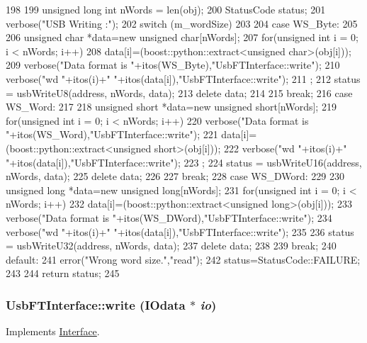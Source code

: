 \begin{DoxyCode}
198 {
199   unsigned long int nWords = len(obj);
200   StatusCode status;
201   verbose("USB Writing :");
202   switch (m_wordSize)
203   {
204   case WS_Byte:
205     {  
206       unsigned char *data=new unsigned char[nWords];
207       for(unsigned int i = 0; i < nWords; i++){
208         data[i]=(boost::python::extract<unsigned char>(obj[i]));
209         verbose("Data format is "+itos(WS_Byte),"UsbFTInterface::write");
210         verbose("wd "+itos(i)+" "+itos(data[i]),"UsbFTInterface::write");
211       };
212       status = usbWriteU8(address, nWords, data);
213       delete data;
214     }
215     break;
216   case WS_Word:
217     { 
218       unsigned short *data=new unsigned short[nWords];
219       for(unsigned int i = 0; i < nWords; i++){
220         verbose("Data format is "+itos(WS_Word),"UsbFTInterface::write");
221         data[i]=(boost::python::extract<unsigned short>(obj[i]));
222         verbose("wd "+itos(i)+" "+itos(data[i]),"UsbFTInterface::write");
223       };
224       status = usbWriteU16(address, nWords, data);
225       delete data;
226     }
227     break;
228   case WS_DWord:
229     {
230       unsigned long *data=new unsigned long[nWords];
231       for(unsigned int i = 0; i < nWords; i++){
232         data[i]=(boost::python::extract<unsigned long>(obj[i]));
233         verbose("Data format is "+itos(WS_DWord),"UsbFTInterface::write");
234         verbose("wd "+itos(i)+" "+itos(data[i]),"UsbFTInterface::write");
235       }    
236       status = usbWriteU32(address, nWords, data);
237       delete data;
238     }
239     break;
240   default:
241     error("Wrong word size.","read");
242     status=StatusCode::FAILURE;
243   }
244   return status;
245 }
\end{DoxyCode}
\hypertarget{classUsbFTInterface_a059296c0d7e5118f975f1dfa2e1f3fbb}{
\subsubsection[{write}]{ UsbFTInterface::write ({\bf IOdata} $\ast$ {\em io})}}
\label{classUsbFTInterface_a059296c0d7e5118f975f1dfa2e1f3fbb}


Implements \hyperlink{classInterface_ad665cacbaf490a26c1c4ba192022e68a}{Interface}.

